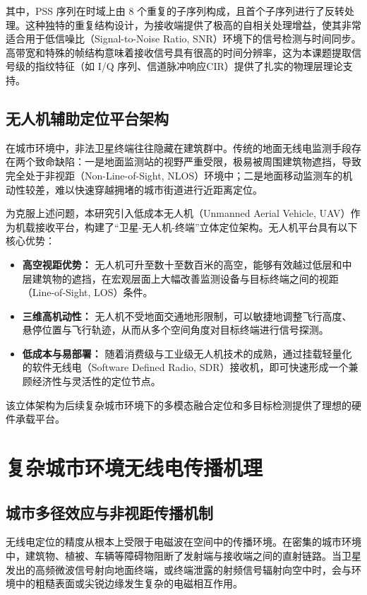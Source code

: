 其中，PSS 序列在时域上由 8 个重复的子序列构成，且首个子序列进行了反转处理。这种独特的重复结构设计，为接收端提供了极高的自相关处理增益，使其非常适合用于低信噪比（Signal-to-Noise Ratio, SNR）环境下的信号检测与时间同步。高带宽和特殊的帧结构意味着接收信号具有很高的时间分辨率，这为本课题提取信号级的指纹特征（如 I/Q 序列、信道脉冲响应CIR）提供了扎实的物理层理论支持。

\subsection{无人机辅助定位平台架构}

在城市环境中，非法卫星终端往往隐藏在建筑群中。传统的地面无线电监测手段存在两个致命缺陷：一是地面监测站的视野严重受限，极易被周围建筑物遮挡，导致完全处于非视距（Non-Line-of-Sight, NLOS）环境中；二是地面移动监测车的机动性较差，难以快速穿越拥堵的城市街道进行近距离定位。

为克服上述问题，本研究引入低成本无人机（Unmanned Aerial Vehicle, UAV）作为机载接收平台，构建了“卫星-无人机-终端”立体定位架构。无人机平台具有以下核心优势：
\begin{itemize}
    \item \textbf{高空视距优势：} 无人机可升至数十至数百米的高空，能够有效越过低层和中层建筑物的遮挡，在宏观层面上大幅改善监测设备与目标终端之间的视距（Line-of-Sight, LOS）条件。
    \item \textbf{三维高机动性：} 无人机不受地面交通地形限制，可以敏捷地调整飞行高度、悬停位置与飞行轨迹，从而从多个空间角度对目标终端进行信号探测。
    \item \textbf{低成本与易部署：} 随着消费级与工业级无人机技术的成熟，通过挂载轻量化的软件无线电（Software Defined Radio, SDR）接收机，即可快速形成一个兼顾经济性与灵活性的定位节点。
\end{itemize}
该立体架构为后续复杂城市环境下的多模态融合定位和多目标检测提供了理想的硬件承载平台。

\section{复杂城市环境无线电传播机理}

\subsection{城市多径效应与非视距传播机制}

无线电定位的精度从根本上受限于电磁波在空间中的传播环境。在密集的城市环境中，建筑物、植被、车辆等障碍物阻断了发射端与接收端之间的直射链路。当卫星发出的高频微波信号射向地面终端，或终端泄露的射频信号辐射向空中时，会与环境中的粗糙表面或尖锐边缘发生复杂的电磁相互作用。

